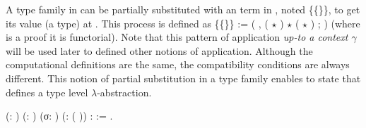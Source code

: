   A type family  in   can be partially substituted with an
  term  in  , noted  \{\{\}\}, to get its value (a type) at
  . This process is defined as  \{\{\}\} := (\coqdocvar{\ensuremath{\lambda}} \coqdocvariable{$\gamma$}, ( $\star$ \coqdocvariable{$\gamma$}) $\star$ ( $\star$ \coqdocvariable{$\gamma$}) ;
  \coqdocvar{\_}) (where \coqdocvar{\_} is a proof it is functorial). Note that this
  pattern of application \emph{up-to a context $\gamma$} will be used
  later to defined other notions of application. Although the
  computational definitions are the same, the compatibility conditions
  are always different.  This notion of partial substitution in a type
  family enables to state that  defines a type level
  $\lambda$-abstraction.  \begin{coqdoccode}
\coqdocemptyline
\coqdocnoindent
{}    (: ) (: ) (σ:\coqdocnotation{[} \coqdocnotation{$\longrightarrow$} \coqdocnotation{]}) (: (  )) \coqdoceol
\coqdocnoindent
:         \coqdocnotation{(}  \coqdocnotation{)} := \coqdocnotation{(} \coqdocvar{$\gamma$}  \coqdocvar{\_} \coqdocnotation{;}    \coqdocnotation{)}.\coqdoceol
\coqdocemptyline
\end{coqdoccode}


